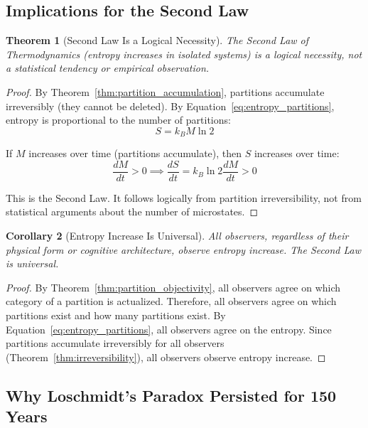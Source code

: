 \documentclass[twocolumn,10pt]{article}
\newtheorem{theorem}{Theorem}[section]
\newtheorem{corollary}[theorem]{Corollary}
\theoremstyle{definition}
\theoremstyle{remark}
\begin{document}
\subsection{Implications for the Second Law}

\begin{theorem}[Second Law Is a Logical Necessity]
\label{thm:second_law_necessity}
The Second Law of Thermodynamics (entropy increases in isolated systems) is a logical necessity, not a statistical tendency or empirical observation.
\end{theorem}

\begin{proof}
By Theorem~\ref{thm:partition_accumulation}, partitions accumulate irreversibly (they cannot be deleted). By Equation~\ref{eq:entropy_partitions}, entropy is proportional to the number of partitions:
\begin{equation}
S = k_B M \ln 2
\end{equation}

If $M$ increases over time (partitions accumulate), then $S$ increases over time:
\begin{equation}
\frac{dM}{dt} > 0 \implies \frac{dS}{dt} = k_B \ln 2 \frac{dM}{dt} > 0
\end{equation}

This is the Second Law. It follows logically from partition irreversibility, not from statistical arguments about the number of microstates.
\end{proof}

\begin{corollary}[Entropy Increase Is Universal]
\label{cor:entropy_universal}
All observers, regardless of their physical form or cognitive architecture, observe entropy increase. The Second Law is universal.
\end{corollary}

\begin{proof}
By Theorem~\ref{thm:partition_objectivity}, all observers agree on which category of a partition is actualized. Therefore, all observers agree on which partitions exist and how many partitions exist. By Equation~\ref{eq:entropy_partitions}, all observers agree on the entropy. Since partitions accumulate irreversibly for all observers (Theorem~\ref{thm:irreversibility}), all observers observe entropy increase.
\end{proof}

\subsection{Why Loschmidt's Paradox Persisted for 150 Years}
\end{document}
